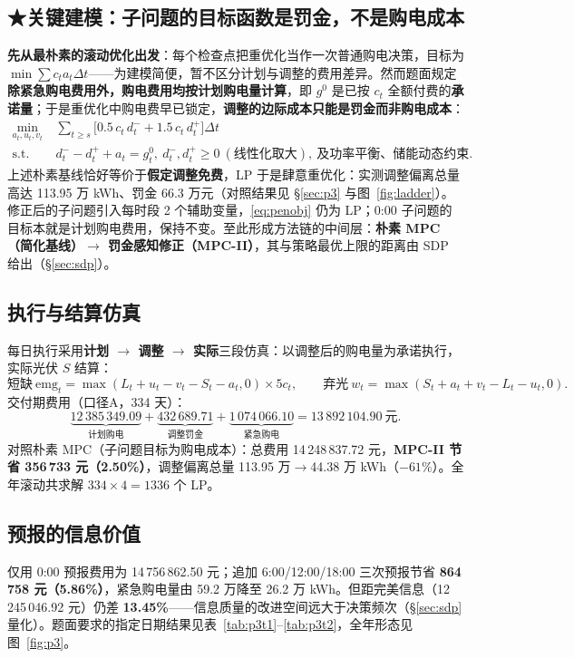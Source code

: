 \documentclass[11pt,a4paper]{ctexart}
\begin{document}
\subsection{★关键建模：子问题的目标函数是罚金，不是购电成本}\label{sec:penalty}
\textbf{先从最朴素的滚动优化出发}：每个检查点把重优化当作一次普通购电决策，目标为 $\min\sum c_t a_t\Delta t$——为建模简便，暂不区分计划与调整的费用差异。然而题面规定\textbf{除紧急购电费用外，购电费用\textbf{均按计划购电量}计算}，即 $g^0$ 是已按 $c_t$ 全额付费的\textbf{承诺量}；于是重优化中购电费早已锁定，\textbf{调整的边际成本只能是罚金而非购电成本}：
\begin{align}
\min_{a_t,u_t,v_t}\ &\sum_{t\ge s}\Big[0.5\,c_t\,d^{-}_t+1.5\,c_t\,d^{+}_t\Big]\Delta t\label{eq:penobj}\\
\text{s.t.}\quad & d^{-}_t-d^{+}_t+a_t=g^0_t,\ d^{-}_t,d^{+}_t\ge0\ (\text{线性化取大}),\ \text{及功率平衡、储能动态约束}.\nonumber
\end{align}
上述朴素基线恰好等价于\textbf{假定调整免费}，LP 于是肆意重优化：实测调整偏离总量高达 113.95 万 kWh、罚金 66.3 万元（对照结果见 \S\ref{sec:p3} 与图~\ref{fig:ladder}）。修正后的子问题引入每时段 2 个辅助变量，\eqref{eq:penobj} 仍为 LP；0:00 子问题的目标本就是计划购电费用，保持不变。至此形成方法链的中间层：\textbf{朴素 MPC（简化基线）$\to$ 罚金感知修正（MPC-II）}，其与策略最优上限的距离由 SDP 给出（\S\ref{sec:sdp}）。

\subsection{执行与结算仿真}
每日执行采用\textbf{计划 $\to$ 调整 $\to$ 实际}三段仿真：以调整后的购电量为承诺执行，实际光伏 $S$ 结算：
\[
\text{短缺}\ \mathrm{emg}_t=\max(L_t+u_t-v_t-S_t-a_t,0)\times 5c_t,\qquad
\text{弃光}\ w_t=\max(S_t+a_t+v_t-L_t-u_t,0).
\]
交付期费用（口径A，334 天）：
\[
\underbrace{12\,385\,349.09}_{\text{计划购电}}+
\underbrace{432\,689.71}_{\text{调整罚金}}+
\underbrace{1\,074\,066.10}_{\text{紧急购电}}
=\boxed{13\,892\,104.90\ \text{元}}.
\]
对照朴素 MPC（子问题目标为购电成本）：总费用 14\,248\,837.72 元，\textbf{MPC-II 节省 356\,733 元（2.50\%）}，调整偏离总量 113.95 万$\to$44.38 万 kWh（$-61\%$）。全年滚动共求解 $334\times4=1336$ 个 LP。

\subsection{预报的信息价值}
仅用 0:00 预报费用为 14\,756\,862.50 元；追加 6:00/12:00/18:00 三次预报节省 \textbf{864\,758 元（5.86\%）}，紧急购电量由 59.2 万降至 26.2 万 kWh。但距完美信息（12\,245\,046.92 元）仍差 \textbf{13.45\%}——信息质量的改进空间远大于决策频次（\S\ref{sec:sdp} 量化）。题面要求的指定日期结果见表~\ref{tab:p3t1}--\ref{tab:p3t2}，全年形态见图~\ref{fig:p3}。
\end{document}
